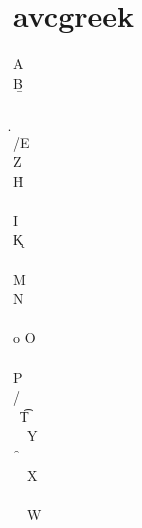\newpage
\section*{avcgreek}\noindent
  \a         A   \\
  \b         B   \\
  \g        \G   \\
  \d        \D   \\
  \e/\ev     E   \\
  \z         Z   \\
  \h         H   \\
  \th       \Th  \\
  \io        I   \\
  \k         K   \\
  \la       \La  \\
  \mu        M   \\
  \nu        N   \\
  \xi       \Xi  \\
   o         O   \\
  \pi       \Pi  \\
  \rh        P   \\
  \si/\siv  \Si  \\
  \t         T   \\
  \up        Y   \\
  \f        \F   \\
  \x         X   \\
  \y        \Y   \\
  \w        \W   \\

